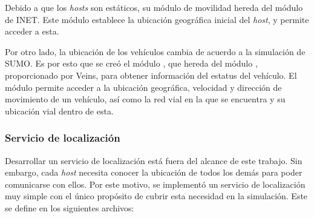 \begin{sloppypar}
Debido a que los \textit{hosts} son estáticos, su módulo de movilidad
 hereda del módulo
\href{https://doc.omnetpp.org/inet/api-current/neddoc/inet.mobility.static.StationaryMobility.html}{}
de INET. Este módulo establece la ubicación geográfica inicial del
\textit{host}, y permite acceder a esta.
\end{sloppypar}

\begin{sloppypar}
Por otro lado, la ubicación de los vehículos cambia de acuerdo a la simulación
de SUMO. Es por esto que se creó el módulo , que hereda del
módulo
\href{https://veins.car2x.org/documentation/modules/#veins_inet}{},
proporcionado por Veins, para obtener información del estatus del vehículo. El
módulo  permite acceder a la ubicación geográfica, velocidad y
dirección de movimiento de un vehículo, así como la red vial en la que se
encuentra y su ubicación vial dentro de esta.
\end{sloppypar}

\subsubsection{Servicio de localización}
\label{subsubsec:servicio_de_localizacion_sim}

Desarrollar un servicio de localización está fuera del alcance de este trabajo.
Sin embargo, cada \textit{host} necesita conocer la ubicación de todos los demás
para poder comunicarse con ellos. Por este motivo, se implementó un servicio de
localización muy simple con el único propósito de cubrir esta necesidad en la
simulación. Este se define en los siguientes archivos:


